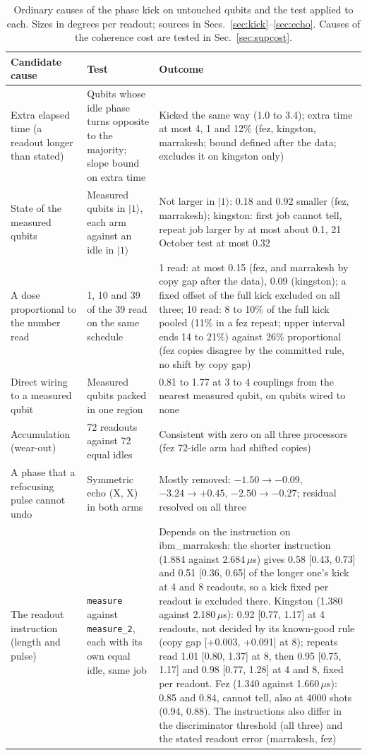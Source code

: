 \documentclass[reprint,amsmath,amssymb,aps,superscriptaddress,nofootinbib]{revtex4-2}
\newcommand{\us}{\,$\mu$s}
\begin{document}
\begin{table}[!tp]
\caption{Ordinary causes of the phase kick on untouched qubits and the test applied to each. Sizes in degrees per readout; sources in Secs.~\ref{sec:kick}--\ref{sec:echo}. Causes of the coherence cost are tested in Sec.~\ref{sec:supcost}.}
\label{tab:causes}
\footnotesize
\begin{tabular}{p{3.6cm}p{6.4cm}p{6.6cm}}
\toprule
Candidate cause & Test & Outcome \\
\midrule
Extra elapsed time (a readout longer than stated) & Qubits whose idle phase turns opposite to the majority; slope bound on extra time & Kicked the same way (1.0 to 3.4); extra time at most 4, 1 and 12\% (fez, kingston, marrakesh; bound defined after the data; excludes it on kingston only) \\
State of the measured qubits & Measured qubits in $|1\rangle$, each arm against an idle in $|1\rangle$ & Not larger in $|1\rangle$: 0.18 and 0.92 smaller (fez, marrakesh); kingston: first job cannot tell, repeat job larger by at most about 0.1, 21 October test at most 0.32 \\
A dose proportional to the number read & 1, 10 and 39 of the 39 read on the same schedule & 1 read: at most 0.15 (fez, and marrakesh by copy gap after the data), 0.09 (kingston); a fixed offset of the full kick excluded on all three; 10 read: 8 to 10\% of the full kick pooled (11\% in a fez repeat; upper interval ends 14 to 21\%) against 26\% proportional (fez copies disagree by the committed rule, no shift by copy gap) \\
Direct wiring to a measured qubit & Measured qubits packed in one region & 0.81 to 1.77 at 3 to 4 couplings from the nearest measured qubit, on qubits wired to none \\
Accumulation (wear-out) & 72 readouts against 72 equal idles & Consistent with zero on all three processors (fez 72-idle arm had shifted copies) \\
A phase that a refocusing pulse cannot undo & Symmetric echo (X, X) in both arms & Mostly removed: $-1.50 \to -0.09$, $-3.24 \to +0.45$, $-2.50 \to -0.27$; residual resolved on all three \\
The readout instruction (length and pulse) & \texttt{measure} against \texttt{measure\_2}, each with its own equal idle, same job & Depends on the instruction on ibm\_marrakesh: the shorter instruction (1.884 against 2.684\us) gives 0.58 [0.43, 0.73] and 0.51 [0.36, 0.65] of the longer one's kick at 4 and 8 readouts, so a kick fixed per readout is excluded there. Kingston (1.380 against 2.180\us): 0.92 [0.77, 1.17] at 4 readouts, not decided by its known-good rule (copy gap [+0.003, +0.091] at 8); repeats read 1.01 [0.80, 1.37] at 8, then 0.95 [0.75, 1.17] and 0.98 [0.77, 1.28] at 4 and 8, fixed per readout. Fez (1.340 against 1.660\us): 0.85 and 0.84, cannot tell, also at 4000 shots (0.94, 0.88). The instructions also differ in the discriminator threshold (all three) and the stated readout error (marrakesh, fez) \\
\bottomrule
\end{tabular}
\end{table}
\end{document}
